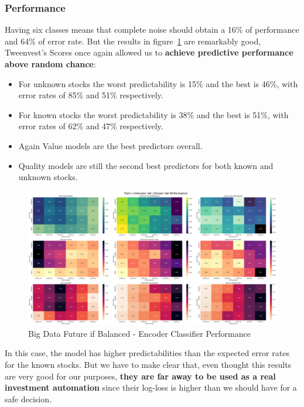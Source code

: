 \documentclass[11pt,english,a4paper,hidelinks]{book}
\begin{document}
\subsubsection{Performance}

\noindent Having six classes means that complete noise should obtain a 16\% of performance and 64\% of error rate. But the results in figure~\ref{fig:multi_class_classifier} are remarkably good, Tweenvest’s Scores once again allowed us to \textbf{achieve predictive performance above random chance}:
\begin{itemize}
    \item For unknown stocks the worst predictability is 15\% and the best is 46\%, with error rates of 85\% and 51\% respectively. 
    \item For known stocks the worst predictability is 38\% and the best is 51\%, with error rates of 62\% and 47\% respectively.
    \item Again Value models are the best predictors overall.
    \item Quality models are still the second best predictors for both known and unknown stocks.
\end{itemize}


\begin{figure}[H]
    \centering
    \includegraphics[width=1\textwidth]{images/code/models/neural_network/classifier_nn/Big Data future - IF HARD Balanced/performance summary.png}
    \caption{Big Data Future \acrshort{if} Balanced - Encoder Classifier Performance}    
    \label{fig:multi_class_classifier}
\end{figure}

\noindent In this case, the model has higher predictabilities than the expected error rates for the known stocks. But we have to make clear that, even thought this results are very good for our purposes, \textbf{they are far away to be used as a real investment automation} since their log-loss is higher than we should have for a safe decision.
\end{document}
